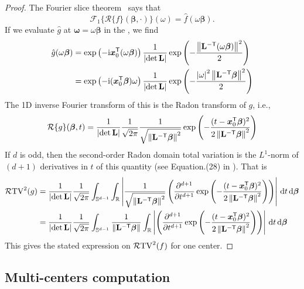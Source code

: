 \begin{proof}
The Fourier slice theorem~\citep{kak_slaney} says that
\[
    \mathcal{F}_1\{\mathcal{R}\{f\}(\bm{\beta}, \cdot)\}(\omega) = \hat{f}(\omega\bm{\beta}).
\]
If we evaluate $ \hat{g}$ at $\bm{\omega} = \omega\bm{\beta}$ in the , we find
\begin{align*}
\hat{g}(\omega\bm{\beta})
&= \exp \left( {-\mathrm{i}\bm{x}_0^\mathsf{T}(\omega\bm{\beta})} \right)  \frac{1}{\left|\det \mathbf{L}\right|} \exp \left( {-\frac{\left\|\mathbf{L}^{-\mathsf{T}} (\omega\bm{\beta})\right\|^2}{2}} \right)  \\
&= \exp \left( {-\mathrm{i}(\bm{x}_0^\mathsf{T}\bm{\beta})\omega} \right)  \frac{1}{\left|\det \mathbf{L}\right|} \exp \left( {-\frac{\left|\omega\right|^2\left\|\mathbf{L}^{-\mathsf{T}} \bm{\beta}\right\|^2}{2}} \right)  \\
\end{align*}
The 1D inverse Fourier transform of this is the Radon transform of $g$, i.e.,
\[
    \mathcal{R}\{g\}(\bm{\beta}, t) = \frac{1}{\left|\det \mathbf{L}\right|} \frac{1}{\sqrt{2\pi}} \frac{1}{\sqrt{\left\|\mathbf{L}^{-\mathsf{T}}\bm{\beta}\right\|^2}} \exp \left( {-\frac{(t- \bm{x}_0^\mathsf{T}\bm{\beta})^2}{2\left\|\mathbf{L}^{-\mathsf{T}}\bm{\beta}\right\|^2}} \right) 
\]
If $d$ is odd, then the second-order Radon domain total variation is the $L^1$-norm of $(d+1)$ derivatives in $t$ of this quantity (see Equation.(28) in \cite{Parhi2020BanachSR}). That is
\begin{align}
    \mathcal{R}\mathrm{TV}^2(g)
    &= \frac{1}{\left|\det \mathbf{L}\right|} \frac{1}{\sqrt{2\pi}} \int_{\mathbb{S}^{d-1}} \int_\mathbb{R}\left|\frac{1}{\sqrt{\left\|\mathbf{L}^{-\mathsf{T}}\bm{\beta}\right\|^2}}  \left( {\frac{\partial^{d+1}}{\partial t^{d+1}} \exp \left( {-\frac{(t-\bm{x}_0^\mathsf{T}\bm{\beta})^2}{2\left\|\mathbf{L}^{-\mathsf{T}}\bm{\beta}\right\|^2}} \right) } \right) \right| \,\mathrm{d}t\,\mathrm{d}\bm{\beta} \label{eq: rtv1}\\
    &= \frac{1}{\left|\det \mathbf{L}\right|} \frac{1}{\sqrt{2\pi}} \int_{\mathbb{S}^{d-1}} \frac{1}{{\left\|\mathbf{L}^{-\mathsf{T}}\bm{\beta}\right\|}} 
    \int_\mathbb{R}
    \left|  \left( {\frac{\partial^{d+1}}{\partial t^{d+1}} \exp \left( {-\frac{(t-\bm{x}_0^\mathsf{T}\bm{\beta})^2}{2\left\|\mathbf{L}^{-\mathsf{T}}\bm{\beta}\right\|^2}} \right) } \right) \right| \,\mathrm{d}t\,\mathrm{d}\bm{\beta} \label{eq: rtv2}
\end{align}
This gives the stated expression on $\mathcal{R}\mathrm{TV}^2({f})$ for one center.
\end{proof}

\subsection{Multi-centers computation}

